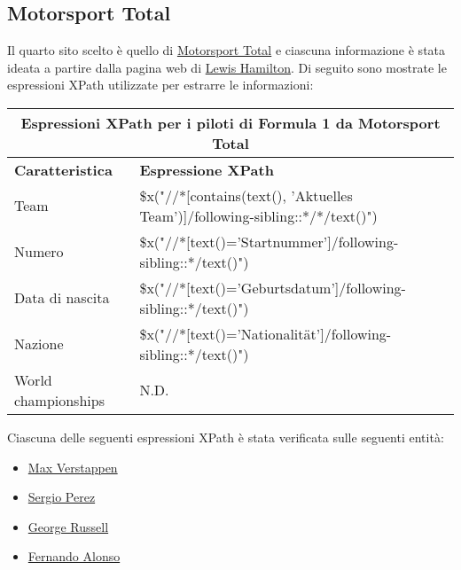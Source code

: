 \documentclass[12pt, letterpaper]{article}
\begin{document}
\subsection{Motorsport Total}
Il quarto sito scelto è quello di \href{https://www.motorsport-total.com}{Motorsport Total} e ciascuna informazione è stata ideata a partire dalla pagina web di \href{https://www.motorsport-total.com/formel-1/teams-und-fahrer/fahrer/lewis-hamilton}{Lewis Hamilton}. Di seguito sono mostrate le espressioni XPath utilizzate per estrarre le informazioni: 
\begin{center}
\begin{table}[!h]
\begin{tabular}{ |p{3cm}|p{9cm}| }
\hline
\multicolumn{2}{|c|}{\textbf{Espressioni XPath per i piloti di Formula 1 da Motorsport Total}} \\
\hline
 \hline
\textbf{Caratteristica} & \textbf{Espressione XPath} \\[1ex]
 \hline\hline
Team & \$x("//*[contains(text(), 'Aktuelles Team')]/following-sibling::*/*/text()") \\
Numero & \$x("//*[text()='Startnummer']/following-sibling::*/text()")  \\
Data di nascita & \$x("//*[text()='Geburtsdatum']/following-sibling::*/text()") \\
Nazione & \$x("//*[text()='Nationalität']/following-sibling::*/text()") \\
World championships & N.D. \\
 \hline
\end{tabular}
\end{table}
\end{center}

Ciascuna delle seguenti espressioni XPath è stata verificata sulle seguenti entità:
\begin{itemize}
    \item \href{https://www.motorsport-total.com/formel-1/teams-und-fahrer/fahrer/max-verstappen}{Max Verstappen}
    \item \href{https://www.motorsport-total.com/formel-1/teams-und-fahrer/fahrer/sergio-perez}{Sergio Perez}
    \item \href{https://www.motorsport-total.com/formel-1/teams-und-fahrer/fahrer/george-russell}{George Russell}
    \item \href{https://www.motorsport-total.com/formel-1/teams-und-fahrer/fahrer/fernando-alonso}{Fernando Alonso}
\end{itemize}
\end{document}
